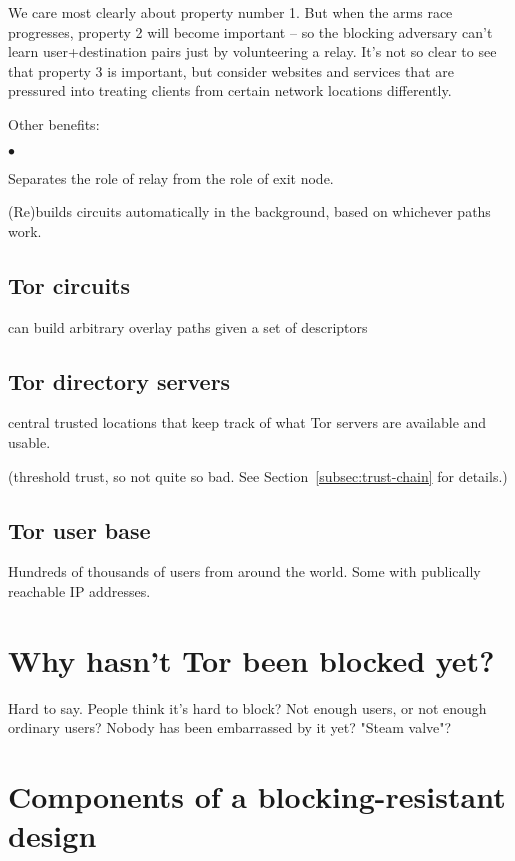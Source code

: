 \documentclass{llncs}
\newenvironment{tightlist}{\begin{list}{$\bullet$}{
  \setlength{\itemsep}{0mm}
    \setlength{\parsep}{0mm}
    }}{\end{list}}
\begin{document}
We care most clearly about property number 1. But when the arms race
progresses, property 2 will become important -- so the blocking adversary
can't learn user+destination pairs just by volunteering a relay. It's not so
clear to see that property 3 is important, but consider websites and
services that are pressured into treating clients from certain network
locations differently.

Other benefits:

\begin{tightlist}
\item Separates the role of relay from the role of exit node.

\item (Re)builds circuits automatically in the background, based on
whichever paths work.
\end{tightlist}

\subsection{Tor circuits}

can build arbitrary overlay paths given a set of descriptors~\cite{blossom}

\subsection{Tor directory servers}

central trusted locations that keep track of what Tor servers are
available and usable.

(threshold trust, so not quite so bad. See
Section~\ref{subsec:trust-chain} for details.)

\subsection{Tor user base}

Hundreds of thousands of users from around the world. Some with publically
reachable IP addresses.

\section{Why hasn't Tor been blocked yet?}

Hard to say. People think it's hard to block? Not enough users, or not
enough ordinary users? Nobody has been embarrassed by it yet? "Steam
valve"?

\section{Components of a blocking-resistant design}
\end{document}
